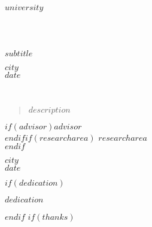 \frenchspacing
\raggedbottom
{}
\pagestyle{plain}


\begin{titlepage}

\makeatletter \begin{center} \textsc{$university$}\\ \vspace*{2cm}
 \\ \vspace*{2cm}
\begin{Huge} \color{CTtitle} \\  \end{Huge} \vspace*{1cm}
\begin{Large} $subtitle$ \end{Large} \vfill
$city$ \\ $date$  \end{center}

\newpage \thispagestyle{empty}  
\begin{center}  \\ \vfill
\begin{Huge} \color{CTtitle} \end{Huge} \vspace*{1,5cm}
\begin{quote} $description$ \end{quote}  \vspace*{2cm}
\begin{flushright} $if(advisor)$$advisor$ \\$endif$$if(researcharea)$
$researcharea$ \\ $endif$\end{flushright} \vfill 
$city$ \\ $date$ \end{center}
\makeatother \end{titlepage}

$if(dedication)$
\clearpage \thispagestyle{empty}  
\mbox{} \vfill
	\begin{flushright} \emph{$dedication$} \end{flushright}
$endif$ $if(thanks)$
\clearpage \thispagestyle{empty}  

